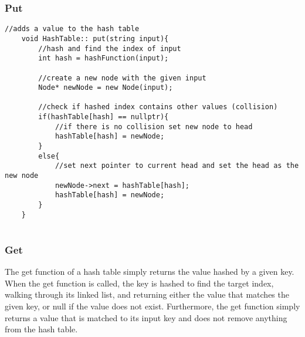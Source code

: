 \documentclass[letterpaper, 10pt,DIV=13]{scrartcl}
\numberwithin{equation}{section} %
\numberwithin{figure}{section} %
\numberwithin{table}{section} %
\begin{document}
\subsubsection*{Put}
    \lstset{numbers=left, numberstyle=\tiny, stepnumber=1, numbersep=5pt, basicstyle=\footnotesize\ttfamily}
    \begin{lstlisting}[frame=single, ]
    //adds a value to the hash table
    void HashTable:: put(string input){
        //hash and find the index of input
        int hash = hashFunction(input);
    
        //create a new node with the given input
        Node* newNode = new Node(input);
    
        //check if hashed index contains other values (collision)
        if(hashTable[hash] == nullptr){ 
            //if there is no collision set new node to head
            hashTable[hash] = newNode;
        }
        else{ 
            //set next pointer to current head and set the head as the new node
            newNode->next = hashTable[hash];
            hashTable[hash] = newNode;
        }
    }
    
\end{lstlisting}

\pagebreak

\subsubsection{Get}
The get function of a hash table simply returns the value hashed by a given key. When the get function is called, the key is hashed to find the target index, walking through its linked list, and returning either the value that matches the given key, or null if the value does not exist. Furthermore, the get function simply returns a value that is matched to its input key and does not remove anything from the hash table.
\end{document}
